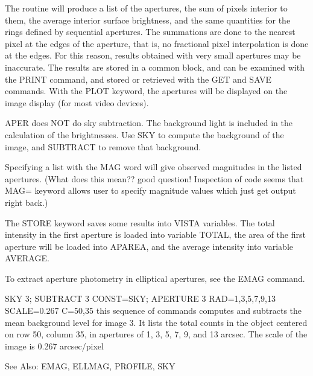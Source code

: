 The routine will produce a list of the apertures, the sum of pixels
interior to them, the average interior surface brightness, and the same
quantities for the rings defined by sequential apertures. The summations
are done to the nearest pixel at the edges of the aperture, that is, no
fractional pixel interpolation is done at the edges.  For this reason,
results obtained with very small apertures may be inaccurate.  The results
are stored in a common block, and can be examined with the PRINT command,
and stored or retrieved with the GET and SAVE commands. With the PLOT
keyword, the apertures will be displayed on the image display (for most
video devices).
 
APER does NOT do sky subtraction.  The background light is included in the
calculation of the brightnesses.  Use SKY to compute the background of the
image, and SUBTRACT to remove that background.

Specifying a list with the MAG word will give observed magnitudes in the
listed apertures. (What does this mean??  good question!  Inspection of
code seems that MAG= keyword allows user to specify magnitude values which
just get output right back.)

The STORE keyword saves some results into VISTA variables. The total
intensity in the first aperture is loaded into variable TOTAL, the area of
the first aperture will be loaded into APAREA, and the average intensity
into variable AVERAGE.

To extract aperture photometry in elliptical apertures, see the EMAG
command.

\begin{example}
  \item[SKY 3; SUBTRACT 3 CONST=SKY; APERTURE 3 RAD=1,3,5,7,9,13
       SCALE=0.267 C=50,35\hfill]{this sequence of commands computes and
       subtracts the mean background level for image 3.  It lists the total
       counts in the object centered on row 50, column 35, in apertures of
       1, 3, 5, 7, 9, and 13 arcsec.  The scale of the image is 0.267
       arcsec/pixel}
\end{example}

See Also: EMAG, ELLMAG, PROFILE, SKY


